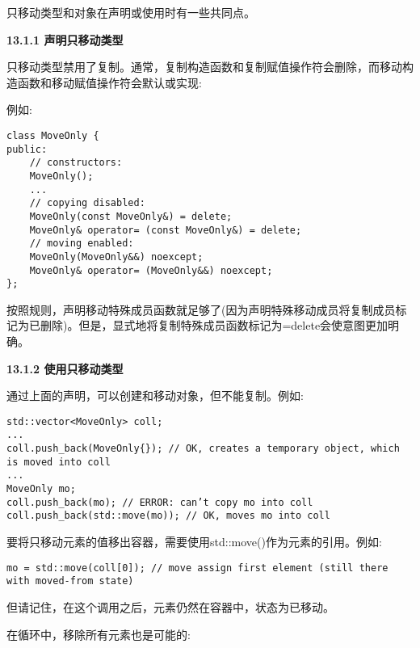 只移动类型和对象在声明或使用时有一些共同点。\par

\hspace*{\fill} \par %
\textbf{13.1.1 声明只移动类型}

只移动类型禁用了复制。通常，复制构造函数和复制赋值操作符会删除，而移动构造函数和移动赋值操作符会默认或实现:\par

例如:\par

\begin{lstlisting}[caption={}]
class MoveOnly {
public:
	// constructors:
	MoveOnly();
	...
	// copying disabled:
	MoveOnly(const MoveOnly&) = delete;
	MoveOnly& operator= (const MoveOnly&) = delete;
	// moving enabled:
	MoveOnly(MoveOnly&&) noexcept;
	MoveOnly& operator= (MoveOnly&&) noexcept;
};
\end{lstlisting}

按照规则，声明移动特殊成员函数就足够了(因为声明特殊移动成员将复制成员标记为已删除)。但是，显式地将复制特殊成员函数标记为=delete会使意图更加明确。\par

\hspace*{\fill} \par %
\textbf{13.1.2 使用只移动类型}

通过上面的声明，可以创建和移动对象，但不能复制。例如:\par

\begin{lstlisting}[caption={}]
std::vector<MoveOnly> coll;
...
coll.push_back(MoveOnly{}); // OK, creates a temporary object, which is moved into coll
...
MoveOnly mo;
coll.push_back(mo); // ERROR: can’t copy mo into coll
coll.push_back(std::move(mo)); // OK, moves mo into coll
\end{lstlisting}

要将只移动元素的值移出容器，需要使用std::move()作为元素的引用。例如:\par

\begin{lstlisting}[caption={}]
mo = std::move(coll[0]); // move assign first element (still there with moved-from state)
\end{lstlisting}

但请记住，在这个调用之后，元素仍然在容器中，状态为已移动。\par

在循环中，移除所有元素也是可能的:\par

